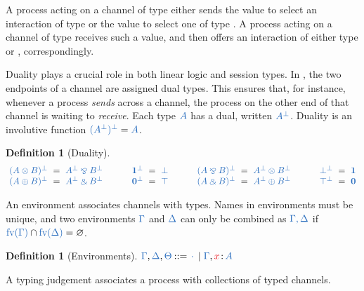 \documentclass[copyright,creativecommons]{eptcs}
\def\Coloneqq{\mathbin{::=}}
\newtheorem{definition}[lemma]{Definition}
\begin{document}
A process acting on a channel of type  either sends the value  to select an interaction of type  or the value  to select one of type . 
A process acting on a channel of type  receives such a value, and then offers an interaction of either type  or , correspondingly.

Duality plays a crucial role in both linear logic and session types. In \cp, the two endpoints of a channel are assigned dual types. This ensures that, for instance, whenever a process \emph{sends} across a channel, the process on the other end of that channel is waiting to \emph{receive}. Each type $\ty{A}$ has a dual, written $\ty{A^\bot}$. Duality is an involutive function \ie $\ty{(A^\bot)^\bot} = \ty{A}$.
\begin{definition}[Duality]\label{def:cp-negation}
  \[
    \setlength{\arraycolsep}{3pt}
    \begin{array}{lclclclclclclcl}
               \ty{(A \tens B)^\bot} & = & \ty{A^\bot \parr B^\bot}
      &\qquad& \ty{\one^\bot}        & = & \ty{\bot}
      &\qquad& \ty{(A \parr B)^\bot} & = & \ty{A^\bot \tens B^\bot}
      &\qquad& \ty{\bot^\bot}        & = & \ty{\one}
      \\       \ty{(A \plus B)^\bot} & = & \ty{A^\bot \with B^\bot}
      &\qquad& \ty{\nil^\bot}        & = & \ty{\top}
      &\qquad& \ty{(A \with B)^\bot} & = & \ty{A^\bot \plus B^\bot}
      &\qquad& \ty{\top^\bot}        & = & \ty{\nil}
    \end{array}
  \]
\end{definition}\noindent
An environment associates channels with types. Names in environments must be unique, and two environments $\ty{\Gamma}$ and $\ty{\Delta}$ can only be combined as $\ty{\Gamma, \Delta}$ if $\ty{\fv{\Gamma}} \cap \ty{\fv{\Delta}} = \varnothing$.
\begin{definition}[Environments]\label{def:cp-environments}
  \(
    \ty{\Gamma}, \ty{\Delta}, \ty{\Theta} \Coloneqq \ty{\emptycontext} \mid \ty{\Gamma}, \tmty{x}{A}
  \)
\end{definition}\noindent
A typing judgement associates a process with collections of typed channels.
\end{document}
